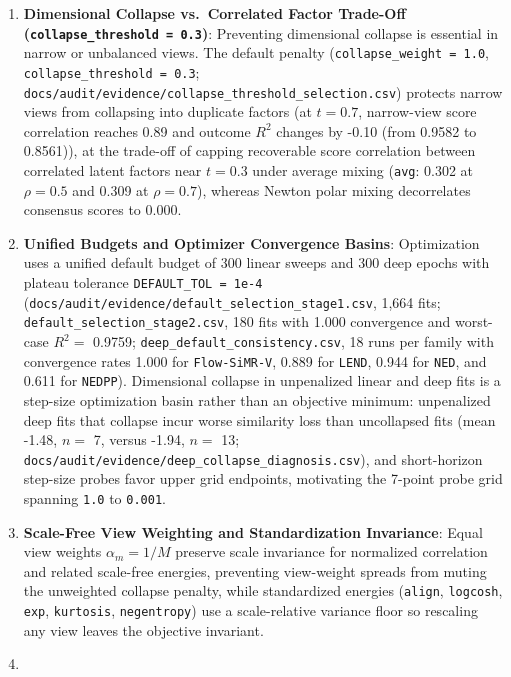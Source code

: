 \documentclass[
  10pt,
  letterpaper,
]{report}
\begin{document}
\begin{enumerate}
  \texttt{NonnegPartsWeak} against 0.644.
\item
  \textbf{Dimensional Collapse vs.~Correlated Factor Trade-Off
  (\texttt{collapse\_threshold\ =\ 0.3})}: Preventing dimensional
  collapse is essential in narrow or unbalanced views. The default
  penalty (\texttt{collapse\_weight\ =\ 1.0},
  \texttt{collapse\_threshold\ =\ 0.3};
  \texttt{docs/audit/evidence/collapse\_threshold\_selection.csv})
  protects narrow views from collapsing into duplicate factors (at
  \(t = 0.7\), narrow-view score correlation reaches 0.89 and outcome
  \(R^2\) changes by -0.10 (from 0.9582 to 0.8561)), at the trade-off of
  capping recoverable score correlation between correlated latent
  factors near \(t = 0.3\) under average mixing (\texttt{avg}: 0.302 at
  \(\rho = 0.5\) and 0.309 at \(\rho = 0.7\)), whereas Newton polar
  mixing decorrelates consensus scores to 0.000.
\item
  \textbf{Unified Budgets and Optimizer Convergence Basins}:
  Optimization uses a unified default budget of \(300\) linear sweeps
  and \(300\) deep epochs with plateau tolerance
  \texttt{DEFAULT\_TOL\ =\ 1e-4}
  (\texttt{docs/audit/evidence/default\_selection\_stage1.csv}, 1,664
  fits; \texttt{default\_selection\_stage2.csv}, 180 fits with 1.000
  convergence and worst-case \(R^2 =\) 0.9759;
  \texttt{deep\_default\_consistency.csv}, 18 runs per family with
  convergence rates 1.000 for \texttt{Flow-SiMR-V}, 0.889 for
  \texttt{LEND}, 0.944 for \texttt{NED}, and 0.611 for \texttt{NEDPP}).
  Dimensional collapse in unpenalized linear and deep fits is a
  step-size optimization basin rather than an objective minimum:
  unpenalized deep fits that collapse incur worse similarity loss than
  uncollapsed fits (mean -1.48, \(n =\) 7, versus -1.94, \(n =\) 13;
  \texttt{docs/audit/evidence/deep\_collapse\_diagnosis.csv}), and
  short-horizon step-size probes favor upper grid endpoints, motivating
  the 7-point probe grid spanning \texttt{1.0} to \texttt{0.001}.
\item
  \textbf{Scale-Free View Weighting and Standardization Invariance}:
  Equal view weights \(\alpha_m = 1/M\) preserve scale invariance for
  normalized correlation and related scale-free energies, preventing
  view-weight spreads from muting the unweighted collapse penalty, while
  standardized energies (\texttt{align}, \texttt{logcosh}, \texttt{exp},
  \texttt{kurtosis}, \texttt{negentropy}) use a scale-relative variance
  floor so rescaling any view leaves the objective invariant.
\item

\end{enumerate}
\end{document}
